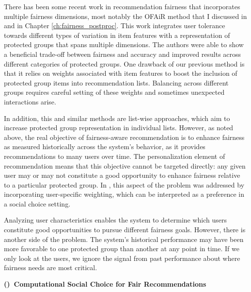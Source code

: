 There has been some recent work in recommendation fairness that incorporates multiple fairness dimensions, most notably the OFAiR method that I discussed in \cite{sonboli-umap-2020} and in Chapter \ref{ch:fairness_postproc}. This work integrates user tolerance towards different types of variation in item features with a representation of protected groups that spans multiple dimensions. The authors were able to show a beneficial trade-off between fairness and accuracy and improved results across different categories of protected groups. One drawback of our previous method \cite{sonboli-umap-2020} is that it relies on weights associated with item features to boost the inclusion of protected group items into recommendation lists. Balancing across different groups requires careful setting of these weights and sometimes unexpected interactions arise.

In addition, this and similar methods are list-wise approaches, which aim to increase protected group representation in individual lists. However, as noted above, the real objective of fairness-aware recommendation is to enhance fairness as measured historically across the system's behavior, as it provides recommendations to many users over time. The personalization element of recommendation means that this objective cannot be targeted directly: any given user may or may not constitute a good opportunity to enhance fairness relative to a particular protected group. In \cite{sonboli-umap-2020}, this aspect of the problem was addressed by incorporating user-specific weighting, which can be interpreted as a preference in a social choice setting.

Analyzing user characteristics enables the system to determine which users constitute good opportunities to pursue different fairness goals. However, there is another side of the problem. The system's historical performance may have been more favorable to one protected group than another at any point in time. If we only look at the users, we ignore the signal from past performance about where fairness needs are most critical.

\vspace{0.25cm}
\noindent \textbf{()~Computational Social Choice for Fair Recommendations}
\vspace{0.25cm}

